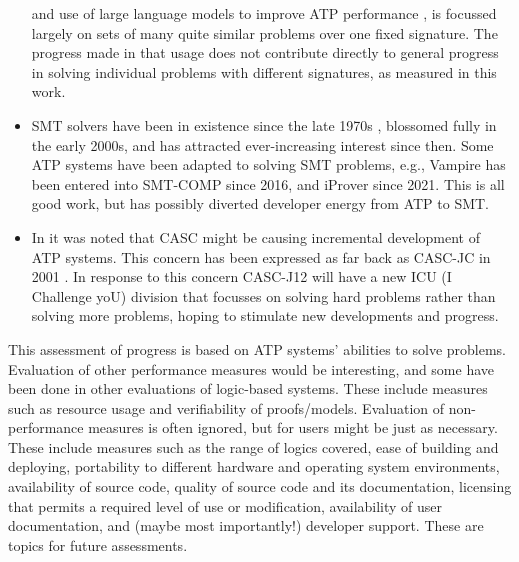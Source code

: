 \documentclass[runningheads]{llncs}
\begin{document}
\begin{itemize}
      and use of large language models to improve ATP performance \cite{WX+23,AS+23},
      is focussed largely on sets of many quite similar problems over one fixed signature.
      The progress made in that usage does not contribute directly to general progress in
      solving individual problems with different signatures, as measured in this work.
\item SMT solvers have been in existence since the late 1970s \cite{NO79}, blossomed fully
      in the early 2000s, and has attracted ever-increasing interest since then.
      Some ATP systems have been adapted to solving SMT problems, e.g., Vampire has been entered
      into SMT-COMP since 2016, and iProver since 2021.
      This is all good work, but has possibly diverted developer energy from ATP to SMT.
\item In \cite{SD24-CASC} it was noted that CASC might be causing incremental development of ATP
      systems.
      This concern has been expressed as far back as CASC-JC in 2001 \cite{PSS02}.
      In response to this concern CASC-J12 will have a new ICU (I Challenge yoU) division that
      focusses on solving hard problems rather than solving more problems, hoping to stimulate
      new developments and progress.
\end{itemize}

This assessment of progress is based on ATP systems' abilities to solve problems.
Evaluation of other performance measures would be interesting, and some have been done
in other evaluations of logic-based systems.
These include measures such as resource usage and verifiability of proofs/models.
Evaluation of non-performance measures is often ignored, but for users might be just as
necessary.
These include measures such as 
the range of logics covered, 
ease of building and deploying,
portability to different hardware and operating system environments, 
availability of source code, 
quality of source code and its documentation,
licensing that permits a required level of use or modification, 
availability of user documentation, 
and (maybe most importantly!)
developer support.
These are topics for future assessments.



\end{document}
